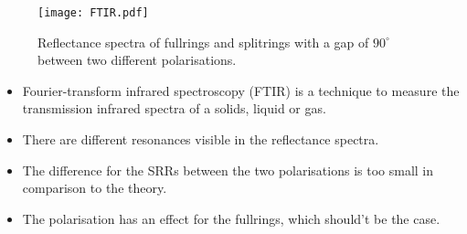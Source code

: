 
  

  \begin{figure}
   \texttt{[image: FTIR.pdf]}
  \caption{Reflectance spectra of fullrings  and splitrings  with a gap of $90^{\circ}$ between two different polarisations. }
  \label{fig:ftir}
  \end{figure}
  
\begin{itemize}
 \item{Fourier-transform infrared spectroscopy (FTIR) is a technique to measure the transmission infrared spectra of a  solids, liquid or gas.} 
\item{There are different resonances visible in the reflectance spectra.}
\item{The difference for the SRRs between the two polarisations is too small in comparison to the theory. }
\item{The polarisation has an effect for the fullrings, which should't be the case. }
  \end{itemize}
